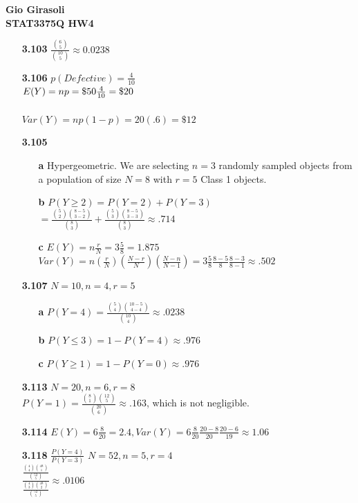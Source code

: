 \documentclass{article}
\begin{document}
\textbf{Gio Girasoli\\STAT3375Q HW4}
\begin{itemize}

	\item[\textbf{3.103}] $\frac{\binom{6}{5}}{\binom{10}{5}} \approx 0.0238$
	\item[\textbf{3.106}] $p(Defective) = \frac{4}{10}$\\
		$E(Y) = np = \mbox{\textdollar}50\frac{4}{10} = \mbox{\textdollar}20$\\\\
		$Var(Y) = np(1-p) = 20(.6) = \$12$
	\item[\textbf{3.105}] \begin{itemize}
			\item[\textbf{a}] Hypergeometric. We are selecting $n=3$ randomly sampled objects from a population of size $N=8$ with $r=5$ Class 1 objects.
			\item[\textbf{b}] $P(Y\geq 2) = P(Y=2)+P(Y=3)$\\
				$= \frac{\binom{5}{2}\binom{8-5}{3-2}}{\binom{8}{3}} + \frac{\binom{5}{3}\binom{8-5}{3-3}}{\binom{8}{3}} \approx .714$
			\item[\textbf{c}] $E(Y)=n\frac{r}{N}=3\frac{5}{8}=1.875$\\
				$Var(Y)=n\left(\frac{r}{N}\right)\left(\frac{N-r}{N}\right)\left(\frac{N-n}{N-1}\right)=3\frac{5}{8}\frac{8-5}{8}\frac{8-3}{8-1}\approx .502$
		\end{itemize}
	\item[\textbf{3.107}] $N=10, n=4, r=5$\begin{itemize}
			\item[\textbf{a}] $P(Y=4)=\frac{\binom{5}{4}\binom{10-5}{4-4}}{\binom{10}{4}}\approx .0238$
			\item[\textbf{b}] $P(Y\leq3)=1-P(Y=4)\approx .976$
			\item[\textbf{c}] $P(Y\geq1)=1-P(Y=0)\approx .976$
		\end{itemize}
	\item[\textbf{3.113}] $N=20, n=6, r=8$\\
		$P(Y=1)=\frac{\binom{8}{1}\binom{12}{5}}{\binom{20}{6}}\approx .163$, which is not negligible.
	\item[\textbf{3.114}] $E(Y)=6\frac{8}{20}=2.4, Var(Y)=6\frac{8}{20}\frac{20-8}{20}\frac{20-6}{19}\approx 1.06$
	\item[\textbf{3.118}] $\frac{P(Y=4)}{P(Y=3)}$  $N=52,n=5,r=4$\\
		$\frac{\frac{\binom{4}{4}\binom{48}{1}}{\binom{52}{5}}}{\frac{\binom{4}{3}\binom{48}{2}}{\binom{52}{5}}}\approx .0106$

\end{itemize}
\end{document}
